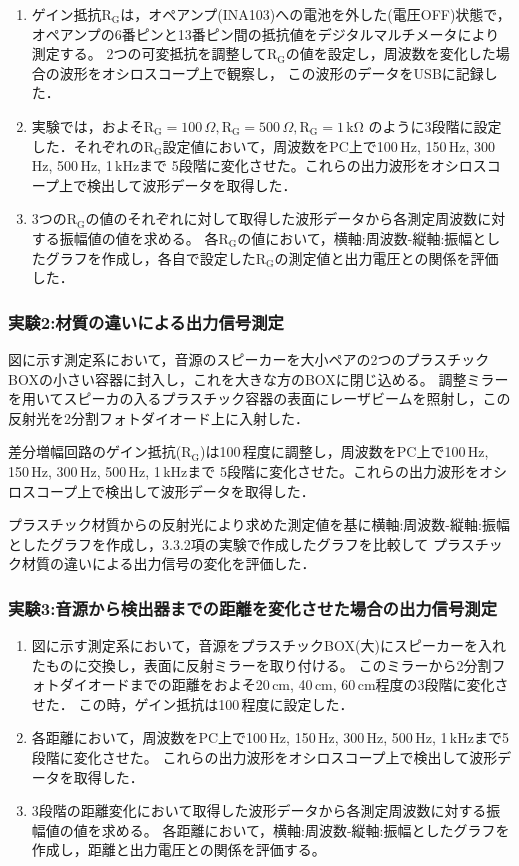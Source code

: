 \documentclass{ltjsarticle}
\begin{document}
			\begin{enumerate}
				\item ゲイン抵抗$\mathrm{R_G}$は，オペアンプ(INA103)への電池を外した(電圧OFF)状態で，
					オペアンプの6番ピンと13番ピン間の抵抗値をデジタルマルチメータにより測定する。
					2つの可変抵抗を調整して$\mathrm{R_G}$の値を設定し，周波数を変化した場合の波形をオシロスコープ上で観察し，
					この波形のデータをUSBに記録した．
				\item 実験では，およそ$\mathrm{R_G} = 100\,\Omega, \mathrm{R_G} = 500\,\Omega, \mathrm{R_G} = 1\,\mathrm{k\Omega}$
					のように3段階に設定した．それぞれの$\mathrm{R_G}$設定値において，周波数をPC上で100\,Hz, 150\,Hz, 300\,Hz, 500\,Hz, 1\,kHzまで
					5段階に変化させた。これらの出力波形をオシロスコープ上で検出して波形データを取得した．
				\item 3つの$\mathrm{R_G}$の値のそれぞれに対して取得した波形データから各測定周波数に対する振幅値の値を求める。
					各$\mathrm{R_G}$の値において，横軸:周波数-縦軸:振幅としたグラフを作成し，各自で設定した$\mathrm{R_G}$の測定値と出力電圧との関係を評価した．
			\end{enumerate}

		\subsubsection{実験2:材質の違いによる出力信号測定}
			図に示す測定系において，音源のスピーカーを大小ペアの2つのプラスチックBOXの小さい容器に封入し，これを大きな方のBOXに閉じ込める。
			調整ミラーを用いてスピーカの入るプラスチック容器の表面にレーザビームを照射し，この反射光を2分割フォトダイオード上に入射した．

			差分増幅回路のゲイン抵抗($\mathrm{R_G}$)は100\,\Omega 程度に調整し，周波数をPC上で100\,Hz, 150\,Hz, 300\,Hz, 500\,Hz, 1\,kHzまで
			5段階に変化させた。これらの出力波形をオシロスコープ上で検出して波形データを取得した．

			プラスチック材質からの反射光により求めた測定値を基に横軸:周波数-縦軸:振幅としたグラフを作成し，3.3.2項の実験で作成したグラフを比較して
			プラスチック材質の違いによる出力信号の変化を評価した．

		\subsubsection{実験3:音源から検出器までの距離を変化させた場合の出力信号測定}
			\begin{enumerate}
				\item 図に示す測定系において，音源をプラスチックBOX(大)にスピーカーを入れたものに交換し，表面に反射ミラーを取り付ける。
					このミラーから2分割フォトダイオードまでの距離をおよそ20\,cm, 40\,cm, 60\,cm程度の3段階に変化させた．
					この時，ゲイン抵抗は100\,\Omega 程度に設定した．
				\item 各距離において，周波数をPC上で100\,Hz, 150\,Hz, 300\,Hz, 500\,Hz, 1\,kHzまで5段階に変化させた。
					これらの出力波形をオシロスコープ上で検出して波形データを取得した．
				\item 3段階の距離変化において取得した波形データから各測定周波数に対する振幅値の値を求める。
					各距離において，横軸:周波数-縦軸:振幅としたグラフを作成し，距離と出力電圧との関係を評価する。
			\end{enumerate}
\end{document}
